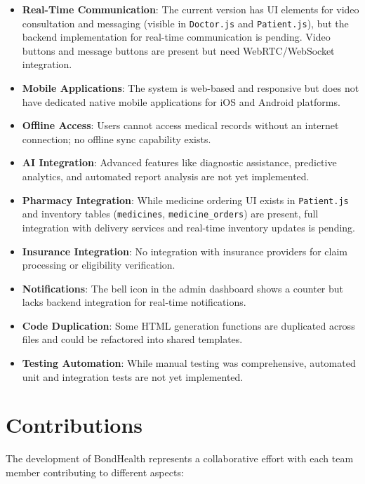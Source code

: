 \begin{itemize}
    \item \textbf{Real-Time Communication}: The current version has UI elements for video consultation and messaging (visible in \texttt{Doctor.js} and \texttt{Patient.js}), but the backend implementation for real-time communication is pending. Video buttons and message buttons are present but need WebRTC/WebSocket integration.
    
    \item \textbf{Mobile Applications}: The system is web-based and responsive but does not have dedicated native mobile applications for iOS and Android platforms.
    
    \item \textbf{Offline Access}: Users cannot access medical records without an internet connection; no offline sync capability exists.
    
    \item \textbf{AI Integration}: Advanced features like diagnostic assistance, predictive analytics, and automated report analysis are not yet implemented.
    
    \item \textbf{Pharmacy Integration}: While medicine ordering UI exists in \texttt{Patient.js} and inventory tables (\texttt{medicines}, \texttt{medicine\_orders}) are present, full integration with delivery services and real-time inventory updates is pending.
    
    \item \textbf{Insurance Integration}: No integration with insurance providers for claim processing or eligibility verification.
    
    \item \textbf{Notifications}: The bell icon in the admin dashboard shows a counter but lacks backend integration for real-time notifications.
    
    \item \textbf{Code Duplication}: Some HTML generation functions are duplicated across files and could be refactored into shared templates.
    
    \item \textbf{Testing Automation}: While manual testing was comprehensive, automated unit and integration tests are not yet implemented.
\end{itemize}

\section{Contributions}
The development of BondHealth represents a collaborative effort with each team member contributing to different aspects:

